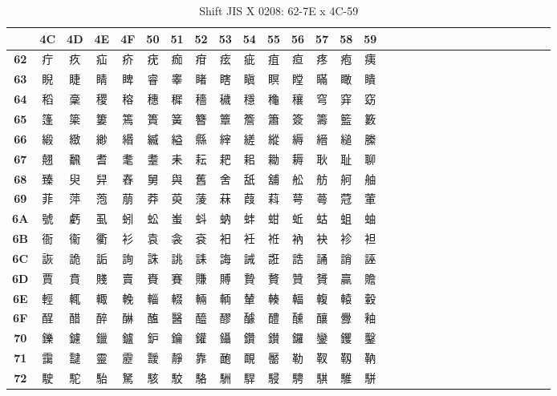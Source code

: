 \begin{table}[H]
\Fontified
\centering
\caption{Shift JIS X 0208: 62-7E x 4C-59}
\begin{tabular}{|Sc|Sc|Sc|Sc|Sc|Sc|Sc|Sc|Sc|Sc|Sc|Sc|Sc|Sc|Sc|}
\hline
 & \textbf{4C} & \textbf{4D} & \textbf{4E} & \textbf{4F} & \textbf{50} & \textbf{51} & \textbf{52} & \textbf{53} & \textbf{54} & \textbf{55} & \textbf{56} & \textbf{57} & \textbf{58} & \textbf{59} \\ \hline
\textbf{62} & 疔 & 疚 & 疝 & 疥 & 疣 & 痂 & 疳 & 痃 & 疵 & 疽 & 疸 & 疼 & 疱 & 痍 \\ \hline
\textbf{63} & 睨 & 睫 & 睛 & 睥 & 睿 & 睾 & 睹 & 瞎 & 瞋 & 瞑 & 瞠 & 瞞 & 瞰 & 瞶 \\ \hline
\textbf{64} & 稻 & 稾 & 稷 & 穃 & 穗 & 穉 & 穡 & 穢 & 穩 & 龝 & 穰 & 穹 & 穽 & 窈 \\ \hline
\textbf{65} & 篷 & 簗 & 簍 & 篶 & 簣 & 簧 & 簪 & 簟 & 簷 & 簫 & 簽 & 籌 & 籃 & 籔 \\ \hline
\textbf{66} & 緞 & 緻 & 緲 & 緡 & 縅 & 縊 & 縣 & 縡 & 縒 & 縱 & 縟 & 縉 & 縋 & 縢 \\ \hline
\textbf{67} & 翹 & 飜 & 耆 & 耄 & 耋 & 耒 & 耘 & 耙 & 耜 & 耡 & 耨 & 耿 & 耻 & 聊 \\ \hline
\textbf{68} & 臻 & 臾 & 舁 & 舂 & 舅 & 與 & 舊 & 舍 & 舐 & 舖 & 舩 & 舫 & 舸 & 舳 \\ \hline
\textbf{69} & 菲 & 萍 & 萢 & 萠 & 莽 & 萸 & 蔆 & 菻 & 葭 & 萪 & 萼 & 蕚 & 蒄 & 葷 \\ \hline
\textbf{6A} & 號 & 虧 & 虱 & 蚓 & 蚣 & 蚩 & 蚪 & 蚋 & 蚌 & 蚶 & 蚯 & 蛄 & 蛆 & 蚰 \\ \hline
\textbf{6B} & 衙 & 衞 & 衢 & 衫 & 袁 & 衾 & 袞 & 衵 & 衽 & 袵 & 衲 & 袂 & 袗 & 袒 \\ \hline
\textbf{6C} & 詼 & 詭 & 詬 & 詢 & 誅 & 誂 & 誄 & 誨 & 誡 & 誑 & 誥 & 誦 & 誚 & 誣 \\ \hline
\textbf{6D} & 賈 & 賁 & 賤 & 賣 & 賚 & 賽 & 賺 & 賻 & 贄 & 贅 & 贊 & 贇 & 贏 & 贍 \\ \hline
\textbf{6E} & 輕 & 輒 & 輙 & 輓 & 輜 & 輟 & 輛 & 輌 & 輦 & 輳 & 輻 & 輹 & 轅 & 轂 \\ \hline
\textbf{6F} & 酲 & 醋 & 醉 & 醂 & 醢 & 醫 & 醯 & 醪 & 醵 & 醴 & 醺 & 釀 & 釁 & 釉 \\ \hline
\textbf{70} & 鑠 & 鑢 & 鑞 & 鑪 & 鈩 & 鑰 & 鑵 & 鑷 & 鑽 & 鑚 & 鑼 & 鑾 & 钁 & 鑿 \\ \hline
\textbf{71} & 靄 & 靆 & 靈 & 靂 & 靉 & 靜 & 靠 & 靤 & 靦 & 靨 & 勒 & 靫 & 靱 & 靹 \\ \hline
\textbf{72} & 駛 & 駝 & 駘 & 駑 & 駭 & 駮 & 駱 & 駲 & 駻 & 駸 & 騁 & 騏 & 騅 & 駢 \\ \hline

\end{tabular}
\end{table}
